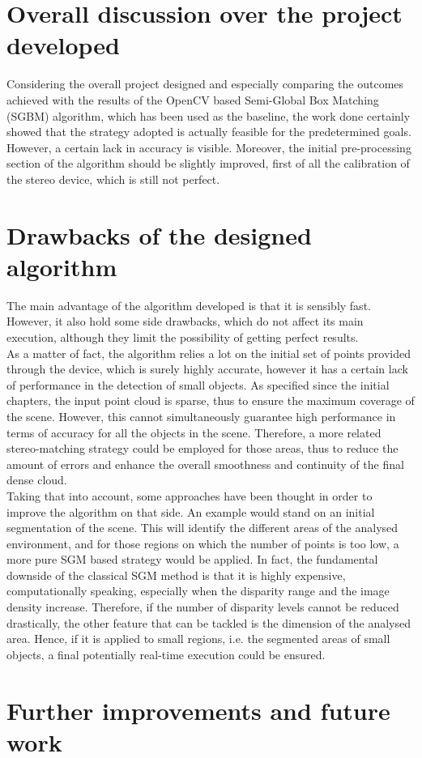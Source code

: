 \section{Overall discussion over the project developed}
\label{section:overall-discussion}

Considering the overall project designed and especially comparing the outcomes achieved with the results of the OpenCV based Semi-Global Box Matching (SGBM) algorithm, which has been used as the baseline, the work done certainly showed that the strategy adopted is actually feasible for the predetermined goals.\\
However, a certain lack in accuracy is visible.
Moreover, the initial pre-processing section of the algorithm should be slightly improved, first of all the calibration of the stereo device, which is still not perfect. 



\section{Drawbacks of the designed algorithm}
\label{section:algorithm-drawbacks}

The main advantage of the algorithm developed is that it is sensibly fast.
However, it also hold some side drawbacks, which do not affect its main execution, although they limit the possibility of getting perfect results.\\
As a matter of fact, the algorithm relies a lot on the initial set of points provided through the device, which is surely highly accurate, however it has a certain lack of performance in the detection of small objects.
As specified since the initial chapters, the input point cloud is sparse, thus to ensure the maximum coverage of the scene. 
However, this cannot simultaneously guarantee high performance in terms of accuracy for all the objects in the scene.
Therefore, a more related stereo-matching strategy could be employed for those areas, thus to reduce the amount of errors and enhance the overall smoothness and continuity of the final dense cloud.\\
Taking that into account, some approaches have been thought in order to improve the algorithm on that side.
An example would stand on an initial segmentation of the scene.
This will identify the different areas of the analysed environment, and for those regions on which the number of points is too low, a more pure SGM based strategy would be applied. 
In fact, the fundamental downside of the classical SGM method is that it is highly expensive, computationally speaking, especially when the disparity range and the image density increase.
Therefore, if the number of disparity levels cannot be reduced drastically, the other feature that can be tackled is the dimension of the analysed area.
Hence, if it is applied to small regions, i.e. the segmented areas of small objects, a final potentially real-time execution could be ensured.


\section{Further improvements and future work}
\label{section:further-improvements}



